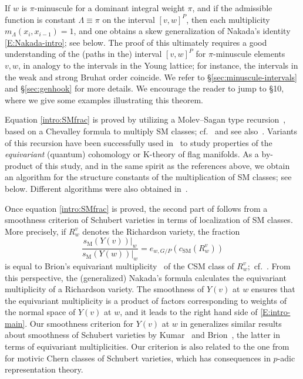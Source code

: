 \documentclass[11pt]{article}
\theoremstyle{definition}
\numberwithin{equation}{section}
\newcommand{\csm}{c_{\mathrm{SM}}}
\newcommand{\ssm}{s_{\mathrm{M}}}
\begin{document}
If $w$ is $\pi$-minuscule for a dominant integral weight $\pi$, and if the admissible function
is constant $\Lambda \equiv \pi$ on the interval $[v,w]^P$,
then each multiplicity $m_\Lambda(x_{i},x_{i-1})=1$, and one obtains 
a skew generalization of Nakada's identity \eqref{E:Nakada-intro}; see  below. 
The proof of this ultimately requires a 
good understanding of the (paths in the) interval $[v,w]^P$ for $\pi$-minuscule elements $v,w$, in analogy to 
the intervals in the Young lattice; for instance, the intervals in the weak and strong Bruhat order
coincide. We refer to \S\ref{sec:minuscule-intervals} and \S\ref{sec:genhook} 
for more details. We encourage the reader to jump to \S10, where we give some 
	examples illustrating this theorem.

Equation \eqref{intro:SMfrac} is proved by utilizing a Molev--Sagan type recursion~\cite{molev.sagan:Littlewood-Richardson}, based on a Chevalley formula to multiply SM classes; 
cf.~ and see also~\cite{su:quantum,AMSS:shadows}. Variants of this recursion have been successfully used in~\cite{knutson.tao:puzzles,
	mihalcea:eqqgr,mihalcea:eqqhom,naruse2014schubert,BCMP:QKChev,naruse2019skew}
to study properties of the {\em equivariant} (quantum) cohomology or K-theory of flag manifolds. As a by-product of this study, and in the same spirit as the references
above, we obtain an algorithm for the structure constants of the multiplication of SM classes; see  below. Different algorithms were also obtained in~\cite{su:structure}.

Once equation \eqref{intro:SMfrac} is proved, the second part of  follows from a smoothness criterion of Schubert varieties 
in terms of localization of SM classes. {More precisely, if $R_w^v$ denotes the 
	Richardson variety, the fraction 
	\begin{equation*}\label{E:intro-eqmult} \frac{\ssm(Y(v))|_w}{\ssm(Y(w))|_w} = 
		e_{w,G/P} (\csm(R_w^{v})) \end{equation*}
	is equal to Brion's equivariant multiplicity~\cite{brion:eq-chow}
	of the CSM class of $R_w^v$;~cf.~. 
	{From this perspective, the (generalized) Nakada's formula calculates the equivariant multiplicity of a Richardson variety.}    
	The smoothness of $Y(v)$ at $w$ ensures that the equivariant multiplicity is a product of factors corresponding to weights of the normal space of $Y(v)$ at $w$, and it leads to the right hand side of
	\eqref{E:intro-main}. Our smoothness criterion for $Y(v)$ at $w$ in  generalizes similar results about smoothness of Schubert varieties by Kumar~\cite{kumar1996nil} and Brion~\cite{brion:eq-chow}, the latter in terms of equivariant multiplicities. Our criterion is also related to the one from~\cite{AMSS:motivic} for motivic Chern classes of Schubert varieties, which has consequences in $p$-adic representation theory.} 
\end{document}
